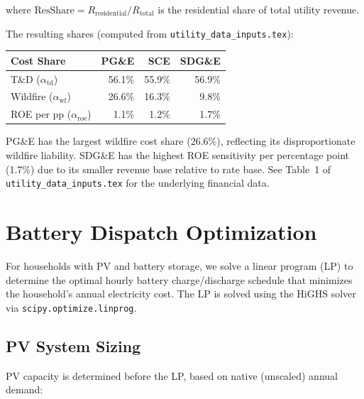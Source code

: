 \documentclass[11pt]{article}
\begin{document}
where $\text{ResShare} = R_{\text{residential}} / R_{\text{total}}$ is the residential share of total utility revenue.

The resulting shares (computed from \texttt{utility\_data\_inputs.tex}):

\begin{table}[htbp]
\centering
\begin{tabular}{l r r r}
\toprule
\textbf{Cost Share} & \textbf{PG\&E} & \textbf{SCE} & \textbf{SDG\&E} \\
\midrule
T\&D ($\alpha_{\text{td}}$) & 56.1\% & 55.9\% & 56.9\% \\
Wildfire ($\alpha_{\text{wf}}$) & 26.6\% & 16.3\% & 9.8\% \\
ROE per pp ($\alpha_{\text{roe}}$) & 1.1\% & 1.2\% & 1.7\% \\
\bottomrule
\end{tabular}
\end{table}

PG\&E has the largest wildfire cost share (26.6\%), reflecting its disproportionate wildfire liability. SDG\&E has the highest ROE sensitivity per percentage point (1.7\%) due to its smaller revenue base relative to rate base. See Table~1 of \texttt{utility\_data\_inputs.tex} for the underlying financial data.

%
%

\newpage
\section{Battery Dispatch Optimization}

For households with PV and battery storage, we solve a linear program (LP) to determine the optimal hourly battery charge/discharge schedule that minimizes the household's annual electricity cost. The LP is solved using the HiGHS solver via \texttt{scipy.optimize.linprog}.

\subsection{PV System Sizing}

PV capacity is determined before the LP, based on native (unscaled) annual demand:
\end{document}
